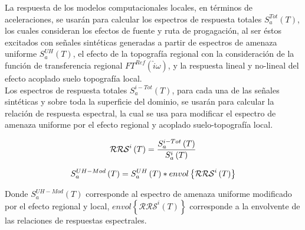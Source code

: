 \documentclass[spanish,letterpaper,12pt,twoside,openany]{article}
\begin{document}
La respuesta de los modelos computacionales locales, en términos de aceleraciones, se usarán para calcular los espectros de respuesta totales $S_{a}^{Tot} \left( T \right)$, los cuales consideran los efectos de fuente y ruta de progagación, al ser éstos excitados con señales sintéticas generadas a partir de espectros de amenaza uniforme $S_{a}^{UH} \left( T \right)$, el efecto de la topografía regional con la consideración de la función de transferencia regional $FT^{Ref} \left( \hat{i} \omega \right)$, y la respuesta lineal y no-lineal del efecto acoplado suelo topografía local.\\
%
Los espectros de respuesta totales $S_{a}^{i-Tot} \left( T \right)$, para cada una de las señales sintéticas y sobre toda la superficie del dominio, se usarán para calcular la relación de respuesta espectral, la cual se usa para modificar el espectro de amenaza uniforme por el efecto regional y acoplado suelo-topografía local.
%
\begin{large}
	\begin{align}\label{eq:rrs}
		\mathcal{RRS}^{i} \left( T \right) = \dfrac{S_{a}^{i-Tot} \left( T \right)}{S_{a}^{i} \left( T \right)}
	\vspace{-1 cm}
	\end{align}
\end{large}
%
\begin{large}
	\begin{align}\label{eq:rrs}
		S_{a}^{UH-Mod} \left( T \right) = S_{a}^{UH} \left( T \right) * envol\left\lbrace \mathcal{RRS}^{i} \left( T \right) \right\rbrace
	\vspace{-1 cm}
	\end{align}
\end{large}
%
Donde $S_{a}^{UH-Mod} \left( T \right)$ corresponde al espectro de amenaza uniforme modificado por el efecto regional y local, $envol \left\lbrace \mathcal{RRS}^{i} \left( T \right) \right\rbrace$ corresponde a la envolvente de las relaciones de respuestas espectrales.
%
%
%
%
%
\end{document}
